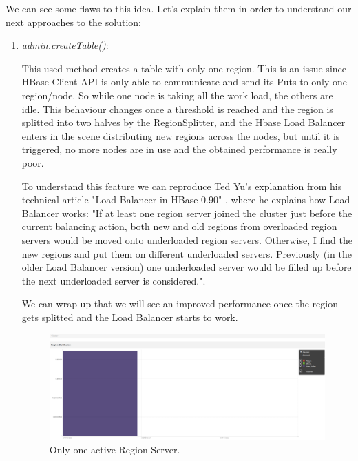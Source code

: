 \bigskip


\par

We can see some flaws to this idea. Let's explain them in order to understand our next approaches to the solution:

\begin{enumerate}
\item \textit{admin.createTable()}:
\par
This used method creates a table with only one region. This is an issue since HBase Client API is only able to communicate and send its Puts to only one region/node. So while one node is taking all the work load, the others are idle. This behaviour changes once a threshold is reached and the region is splitted into two halves by the RegionSplitter, and the Hbase Load Balancer enters in the scene distributing new regions across the nodes, but until it is triggered, no more nodes are in use and the obtained performance is really poor.
\par

To understand this feature we can reproduce Ted Yu's explanation from his technical article "Load Balancer in HBase 0.90" \cite{LoadBalancer}, where he explains how Load Balancer works: "If at least one region server joined the cluster just before the current balancing action, both new and old regions from overloaded region servers would be moved onto underloaded region servers. Otherwise, I find the new regions and put them on different underloaded servers. Previously (in the older Load Balancer version) one underloaded server would be filled up before the next underloaded server is considered.".
\par
We can wrap up that we will see an improved performance once the region gets splitted and the Load Balancer starts to work.



\bigskip
\begin{figure}[htb]
\centering
\includegraphics[width=1\textwidth]{./images/1regionserveractive.png}
\caption{Only one active Region Server.} \label{fig:1regionserveractive}
\end{figure}



\end{enumerate}

